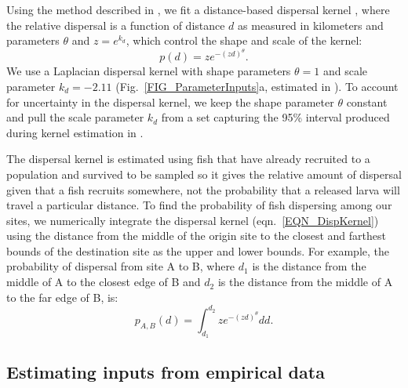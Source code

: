 \documentclass[12pt, oneside]{article}   	%
\begin{document}
Using the method described in \citep{bode2018estimating}, we fit a distance-based dispersal kernel \citep{catalanoInPrepconnectivity}, where the relative dispersal is a function of distance $d$ as measured in kilometers and parameters $\theta$ and $z = e^{k_d}$, which control the shape and scale of the kernel:
\begin{equation}
p(d) = ze^{-(zd)^\theta}. \label{EQN_DispKernel}
\end{equation}
We use a Laplacian dispersal kernel with shape parameters $\theta = 1$ and scale parameter $k_d = -2.11$ (Fig.\ \ref{FIG_ParameterInputs}a, estimated in \citep{catalanoInPrepconnectivity}). To account for uncertainty in the dispersal kernel, we keep the shape parameter $\theta$ constant and pull the scale parameter $k_d$ from a set capturing the 95\% interval produced during kernel estimation in \cite{catalanoInPrepconnectivity}.

The dispersal kernel is estimated using fish that have already recruited to a population and survived to be sampled so it gives the relative amount of dispersal given that a fish recruits somewhere, not the probability that a released larva will travel a particular distance. To find the probability of fish dispersing among our sites, we numerically integrate the dispersal kernel (eqn.\ \ref{EQN_DispKernel}) using the distance from the middle of the origin site to the closest and farthest bounds of the destination site as the upper and lower bounds. For example, the probability of dispersal from site A to B, where $d_1$ is the distance from the middle of A to the closest edge of B and $d_2$ is the distance from the middle of A to the far edge of B, is:
\begin{equation} %
p_{A, B}(d) = \int_{d_1}^{d_2} z e^{-(zd)^\theta}  dd. \label{EQN_integratingDK}
\end{equation}

\subsection*{Estimating inputs from empirical data} %

\end{document}
